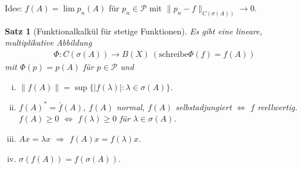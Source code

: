 \documentclass[12pt]{extreport} %
\newtheorem{Satz}{Satz}[subsection]
\numberwithin{equation}{section}
\begin{document}
	Idee: $f(A) = \lim p_n(A)$ für $p_n\in \mathcal{P}$ mit $\|p_n-f\|_{C(\sigma(A))}\rightarrow 0$.
	
	
	\begin{Satz}[Funktionalkalkül für stetige Funktionen]
		Es gibt eine lineare, multiplikative Abbildung 
		\begin{align*}
			\Phi: C(\sigma(A)) \rightarrow B(X) ~(\text{schreibe} \Phi(f) = f(A))
		\end{align*}
		mit $\Phi(p) = p(A)$ für $p\in \mathcal{P}$ und
		\begin{enumerate}[(i)]
			\item $\|f(A)\| = \sup\{|f(\lambda)|: \lambda\in \sigma(A) \}$.
			\item $f(A)^* = \bar{f}(A)$, $f(A)$ normal, $f(A)$ selbstadjungiert $\Leftrightarrow$ $f$ reellwertig. $f(A)\geq 0$ $\Leftrightarrow$ $f(\lambda)\geq 0$ für $\lambda\in \sigma(A)$.
			\item $Ax = \lambda x$ $\Rightarrow$ $f(A)x = f(\lambda)x$.
			\item $\sigma(f(A)) = f(\sigma(A))$.
		\end{enumerate}
	\end{Satz}
	
\end{document}
